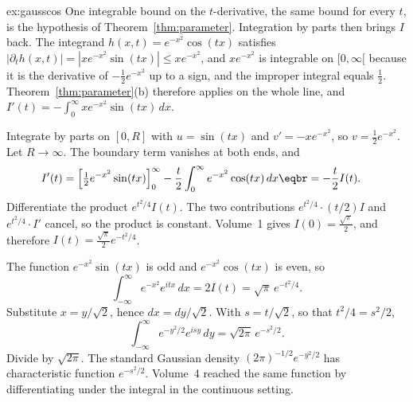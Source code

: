 \begin{solution}{ex:gausscos}
\idea One integrable bound on the \(t\)-derivative, the same bound for every \(t\), is the hypothesis of Theorem~\ref{thm:parameter}. Integration by parts then brings \(I\) back.
\writeup The integrand \(h(x,t)=e^{-x^2}\cos(tx)\) satisfies \(|\partial_th(x,t)|=|xe^{-x^2}\sin(tx)|\le xe^{-x^2}\), and \(xe^{-x^2}\) is integrable on \([0,\infty[\) because it is the derivative of \(-\frac12e^{-x^2}\) up to a sign, and the improper integral equals \(\frac12\). Theorem~\ref{thm:parameter}(b) therefore applies on the whole line, and \(I'(t)=-\int_0^\infty xe^{-x^2}\sin(tx)\,dx\).

Integrate by parts on \([0,R]\) with \(u=\sin(tx)\) and \(v'=-xe^{-x^2}\), so \(v=\frac12e^{-x^2}\). Let \(R\to\infty\). The boundary term vanishes at both ends, and
\[\begin{aligned}I'(t)&=\Bigl[\tfrac12e^{-x^2}\sin(tx)\Bigr]_0^\infty-\frac t2\int_0^\infty e^{-x^2}\cos(tx)\,dx\eqbr=-\frac t2I(t).\end{aligned}\]
Differentiate the product \(e^{t^2/4}I(t)\). The two contributions \(e^{t^2/4}\cdot(t/2)I\) and \(e^{t^2/4}\cdot I'\) cancel, so the product is constant. Volume~1 gives \(I(0)=\frac{\sqrt\pi}2\), and therefore \(I(t)=\frac{\sqrt\pi}2e^{-t^2/4}\).

The function \(e^{-x^2}\sin(tx)\) is odd and \(e^{-x^2}\cos(tx)\) is even, so
\[
\int_{-\infty}^\infty e^{-x^2}e^{itx}\,dx=2I(t)=\sqrt\pi\,e^{-t^2/4}.
\]
Substitute \(x=y/\sqrt2\), hence \(dx=dy/\sqrt2\). With \(s=t/\sqrt2\), so that \(t^2/4=s^2/2\),
\[
\int_{-\infty}^\infty e^{-y^2/2}e^{isy}\,dy=\sqrt{2\pi}\,e^{-s^2/2}.
\]
Divide by \(\sqrt{2\pi}\). The standard Gaussian density \((2\pi)^{-1/2}e^{-y^2/2}\) has characteristic function \(e^{-s^2/2}\). Volume~4 reached the same function by differentiating under the integral in the continuous setting.
\end{solution}

